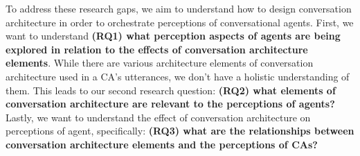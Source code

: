 

To address these research gaps, we aim to understand how to design conversation architecture in order to orchestrate perceptions of conversational agents.
First, we want to understand \textbf{(RQ1) what perception aspects of agents are being explored in relation to the effects of conversation architecture elements}. While there are various architecture elements of conversation architecture used in a CA's utterances, we don't have a holistic understanding of them. This leads to our second research question: \textbf{(RQ2) what elements of conversation architecture are relevant to the perceptions of agents?} Lastly, we want to understand the effect of conversation architecture on perceptions of agent, specifically: \textbf{(RQ3) what are the relationships between conversation architecture elements and the perceptions of CAs?}


